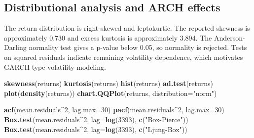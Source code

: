 \documentclass[
  11pt,
]{article}
\newenvironment{Shaded}{\begin{snugshade}}{\end{snugshade}}
\newcommand{\AttributeTok}[1]{\textcolor[rgb]{0.13,0.29,0.53}{#1}}
\newcommand{\DecValTok}[1]{\textcolor[rgb]{0.00,0.00,0.81}{#1}}
\newcommand{\FunctionTok}[1]{\textcolor[rgb]{0.13,0.29,0.53}{\textbf{#1}}}
\newcommand{\NormalTok}[1]{#1}
\newcommand{\OtherTok}[1]{\textcolor[rgb]{0.56,0.35,0.01}{#1}}
\newcommand{\SpecialCharTok}[1]{\textcolor[rgb]{0.81,0.36,0.00}{\textbf{#1}}}
\newcommand{\StringTok}[1]{\textcolor[rgb]{0.31,0.60,0.02}{#1}}
\begin{document}
\begin{Shaded}
\end{Shaded}

\subsection{Distributional analysis and ARCH
effects}\label{distributional-analysis-and-arch-effects}

The return distribution is right-skewed and leptokurtic. The reported
skewness is approximately 0.730 and excess kurtosis is approximately
3.894. The Anderson-Darling normality test gives a p-value below 0.05,
so normality is rejected. Tests on squared residuals indicate remaining
volatility dependence, which motivates GARCH-type volatility modeling.

\begin{Shaded}
\begin{Highlighting}[]
\FunctionTok{skewness}\NormalTok{(returns)}
\FunctionTok{kurtosis}\NormalTok{(returns)}
\FunctionTok{hist}\NormalTok{(returns)}
\FunctionTok{ad.test}\NormalTok{(returns)}
\FunctionTok{plot}\NormalTok{(}\FunctionTok{density}\NormalTok{(returns))}
\FunctionTok{chart.QQPlot}\NormalTok{(returns, }\AttributeTok{distribution=}\StringTok{"norm"}\NormalTok{)}

\FunctionTok{acf}\NormalTok{(mean.residuals}\SpecialCharTok{\^{}}\DecValTok{2}\NormalTok{, }\AttributeTok{lag.max=}\DecValTok{30}\NormalTok{)}
\FunctionTok{pacf}\NormalTok{(mean.residuals}\SpecialCharTok{\^{}}\DecValTok{2}\NormalTok{, }\AttributeTok{lag.max=}\DecValTok{30}\NormalTok{)}
\FunctionTok{Box.test}\NormalTok{(mean.residuals}\SpecialCharTok{\^{}}\DecValTok{2}\NormalTok{, }\AttributeTok{lag=}\FunctionTok{log}\NormalTok{(}\DecValTok{3393}\NormalTok{), }\FunctionTok{c}\NormalTok{(}\StringTok{"Box{-}Pierce"}\NormalTok{))}
\FunctionTok{Box.test}\NormalTok{(mean.residuals}\SpecialCharTok{\^{}}\DecValTok{2}\NormalTok{, }\AttributeTok{lag=}\FunctionTok{log}\NormalTok{(}\DecValTok{3393}\NormalTok{), }\FunctionTok{c}\NormalTok{(}\StringTok{"Ljung{-}Box"}\NormalTok{))}
\end{Highlighting}
\end{Shaded}
\end{document}
